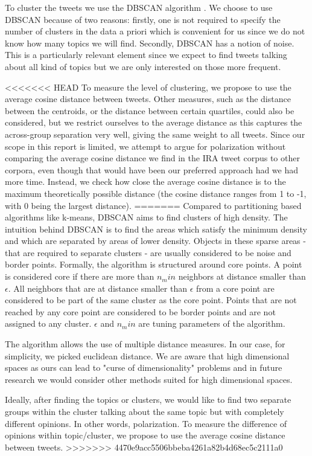 \documentclass[12pt, authoryear]{elsarticle}
\begin{document}
To cluster the tweets we use the DBSCAN algorithm \cite{ester1996density}. We choose to use DBSCAN  because of two reasons: firstly, one is not required to specify the number of clusters in the data a priori which is convenient for us since we do not know how many topics we will find. Secondly, DBSCAN has a notion of noise. This is a particularly relevant element since we expect to find tweets talking about all kind of topics but we are only interested on those more frequent.

<<<<<<< HEAD
To measure the level of clustering, we propose to use the average cosine distance between tweets. Other measures, such as the distance between the centroids, or the distance between certain quartiles, could also be considered, but we restrict ourselves to the average distance as this captures the across-group separation very well, giving the same weight to all tweets. Since our scope in this report is limited, we attempt to argue for polarization without comparing the average cosine distance we find in the IRA tweet corpus to other corpora, even though that would have been our preferred approach had we had more time. Instead, we check how close the average cosine distance is to the maximum theoretically possible distance (the cosine distance ranges from 1 to -1, with 0 being the largest distance).
=======
Compared to partitioning based algorithms like k-means, DBSCAN aims to find clusters of high density. The intuition behind DBSCAN is to find the areas which satisfy the minimum density and which are separated by areas of lower density. Objects in these sparse areas - that are required to separate clusters - are usually considered to be noise and border points. Formally, the algorithm is structured around core points. A point is considered core if there are more than $n_min$ neighbors at distance smaller than $\epsilon$. All neighbors that are at distance smaller than $\epsilon$ from a core point are considered to be part of the same cluster as the core point. Points that are not reached by any core point are considered to be border points and are not assigned to any cluster. $\epsilon$ and $n_min$ are tuning parameters of the algorithm.

The algorithm allows the use of multiple distance measures. In our case, for simplicity, we picked euclidean distance. We are aware that high dimensional spaces as ours can lead to "curse of dimensionality" problems and in future research we would consider other methods suited for high dimensional spaces.

Ideally, after finding the topics or clusters, we would like to find two separate groups within the cluster talking about the same topic but with completely different opinions. In other words, polarization. To measure the difference of opinions within topic/cluster, we propose to use the average cosine distance between tweets.
>>>>>>> 4470e9acc5506bbeba4261a82b4d68ec5c2111a0
\end{document}
